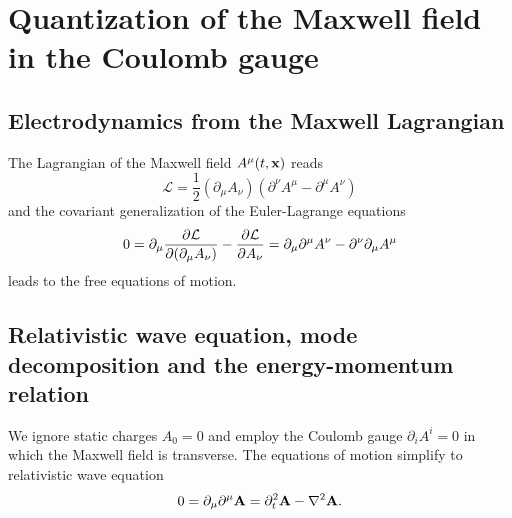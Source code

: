 \section{Quantization of the Maxwell field in the Coulomb gauge}

\subsection{Electrodynamics from the Maxwell Lagrangian}

The Lagrangian of the Maxwell field $A^\mu(t,\vb{x})$ reads~\cite[p.~339]{Srednicki2007}
\begin{equation}
	\mathcal{L}
	=
	\frac{1}{2}
	(\partial_\mu A_\nu)
	\left(
		\partial^\nu A^\mu
		-
		\partial^\mu A^\nu
	\right)
\end{equation}
and the covariant generalization of the Euler-Lagrange equations
\begin{equation}
	0
	=
	\partial_\mu
	\pdv{\mathcal{L}}{(\partial_\mu A_\nu)}
	-
	\pdv{\mathcal{L}}{A_\nu}
	=
	\partial_\mu\partial^\mu A^\nu
	-
	\partial^\nu\partial_\mu A^\mu
\end{equation}
leads to the free equations of motion.

\subsection{Relativistic wave equation, mode decomposition and the energy-momentum relation}

We ignore static charges $A_0=0$ and employ the Coulomb gauge $\partial_iA^i=0$ in which the Maxwell field is transverse.
The equations of motion simplify to relativistic wave equation
\begin{equation}
	0
	=
	\partial_\mu\partial^\mu\vb{A}
	=
	\partial_t^2\vb{A}
	-
	\laplacian\vb{A}
	.
\end{equation}


